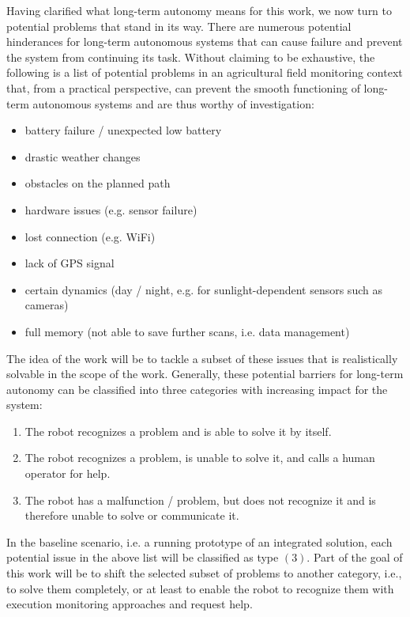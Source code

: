\documentclass[english, master, expose, utf8]{base/thesis_KBS}
\begin{document}
Having clarified what long-term autonomy means for this work, we now turn to potential problems that stand in its way.
There are numerous potential hinderances for long-term autonomous systems that can cause failure and prevent the system from continuing its task.
Without claiming to be exhaustive, the following is a list of potential problems in an agricultural field monitoring context that, from a practical perspective,
can prevent the smooth functioning of long-term autonomous systems and are thus worthy of investigation:
\begin{itemize}
    \item battery failure / unexpected low battery
    \item drastic weather changes
    \item obstacles on the planned path
    \item hardware issues (e.g. sensor failure)
    \item lost connection (e.g. WiFi)
    \item lack of GPS signal
    \item certain dynamics (day / night, e.g. for sunlight-dependent sensors such as cameras)
    \item full memory (not able to save further scans, i.e. data management)
\end{itemize}
The idea of the work will be to tackle a subset of these issues that is realistically solvable in the scope of the work.
Generally, these potential barriers for long-term autonomy can be classified into three categories with increasing impact for the system:
\begin{enumerate}
    \item The robot recognizes a problem and is able to solve it by itself.
    \item The robot recognizes a problem, is unable to solve it, and calls a human operator for help.
    \item The robot has a malfunction / problem, but does not recognize it and is therefore unable to solve or communicate it.
\end{enumerate}
In the baseline scenario, i.e. a running prototype of an integrated solution, each potential issue in the above list will be classified as type $(3)$.
Part of the goal of this work will be to shift the selected subset of problems to another category, i.e., to solve them completely, 
or at least to enable the robot to recognize them with execution monitoring approaches and request help.
\end{document}
